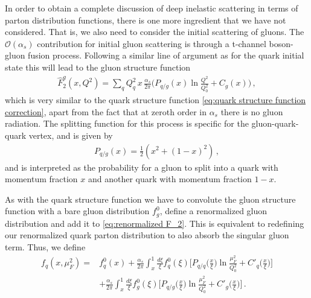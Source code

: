 In order to obtain a complete discussion of deep inelastic scattering in terms of parton distribution functions, there is one more ingredient that we have not considered. That is, we also need to consider the initial scattering of gluons. The $\mathcal{O}(\alpha_s)$ contribution for initial gluon scattering is through a t-channel boson-gluon fusion process. Following a similar line of argument as for the quark initial state this will lead to the gluon structure function
\begin{align}
    \hat{F}_{2}^{g}(x,Q^{2})=\sum_{q}Q_{q}^{2}\,x\,\frac{\alpha_s}{2\pi}\Big(P_{q/g}(x)\ln{\frac{Q^{2}}{Q_{0}^{2}}}+C_{g}(x)\Big)\,,
\end{align}
which is very similar to the quark structure function \cref{eq:quark structure function correction}, apart from the fact that at zeroth order in $\alpha_s$ there is no gluon radiation. The splitting function for this process is specific for the gluon-quark-quark vertex, and is given by
\begin{align}
    P_{q/g}(x)=\frac{1}{2}(x^{2}+(1-x)^{2})\,,
\end{align}
and is interpreted as the probability for a gluon to split into a quark with momentum fraction $x$ and another quark with momentum fraction $1-x$. 

As with the quark structure function we have to convolute the gluon structure function with a bare gluon distribution $f_{g}^{0}$, define a renormalized gluon distribution and add it to \cref{eq:renormalized F_2}. This is equivalent to redefining our renormalized quark parton distribution to also absorb the singular gluon term. Thus, we define
\begin{align}
    f_{q}(x,\mu_{F}^{2})=&f_{q}^{0}(x)+\frac{\alpha_s}{2\pi}\int_{x}^{1}\frac{d\xi}{\xi}f_{q}^{0}(\xi)\big[P_{q/q}\big(\frac{x}{\xi}\big)\ln{\frac{\mu_{F}^{2}}{Q_{0}^{2}}}+C'_{q}\big(\frac{x}{\xi}\big)\big]\nonumber
    \\
    &+\frac{\alpha_s}{2\pi}\int_{x}^{1}\frac{d\xi}{\xi}f_{g}^{0}(\xi)\big[P_{q/g}\big(\frac{x}{\xi}\big)\ln{\frac{\mu_{F}^{2}}{Q_{0}^{2}}}+C'_{g}\big(\frac{x}{\xi}\big)\big]\,.
\end{align}

